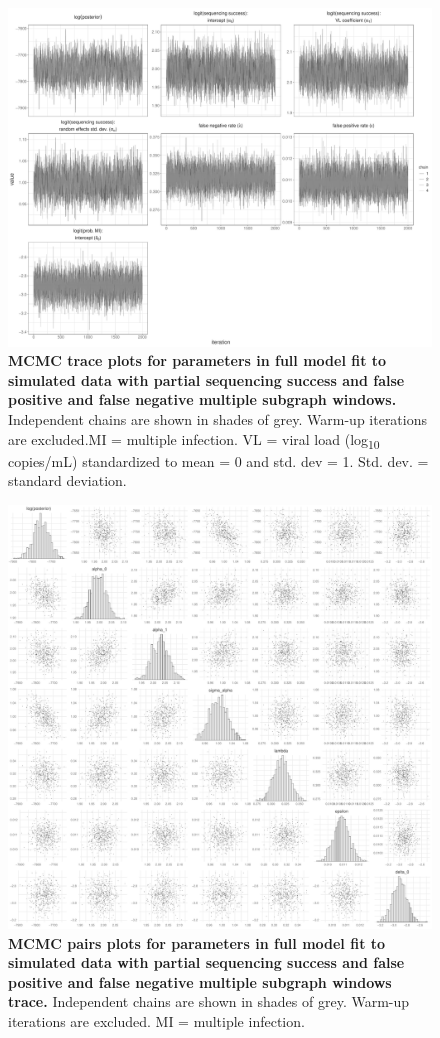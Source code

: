 \documentclass[10pt,letterpaper]{article}
\begin{document}
\begin{figure}[!ht]
 \includegraphics[width=1\textwidth]{../../figures/full_simulation_full_trace.pdf}
\caption{{\bf MCMC trace plots for parameters in full model fit to simulated data with partial sequencing success and false positive and false negative multiple subgraph windows.} Independent chains are shown in shades of grey. Warm-up iterations are excluded.MI = multiple infection. VL = viral load (log\textsubscript{10} copies/mL) standardized to mean = 0 and std. dev = 1. Std. dev. = standard deviation. }
\end{figure}

\begin{figure}[!ht]
 \includegraphics[width=1\textwidth]{../../figures/full_simulation_full_pairs.pdf}
\caption{{\bf MCMC pairs plots for parameters in full model fit to simulated data with partial sequencing success and false positive and false negative multiple subgraph windows trace.} Independent chains are shown in shades of grey. Warm-up iterations are excluded. MI = multiple infection.  }
\end{figure}
\end{document}
